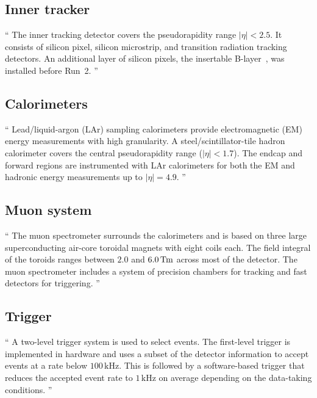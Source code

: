 \subsection{Inner tracker}
\label{sec:atlas_tracker}
\begin{displayquote}
``%
The inner tracking detector covers the pseudorapidity range $|\eta| < 2.5$.
It consists of silicon pixel, silicon microstrip, and transition radiation
tracking detectors.
An additional layer of silicon pixels, the insertable
B-layer~\cite{ATLAS-TDR-19, PIX-2018-001}, was installed before Run~2.%
''~\cite{atlas2022searches}
\end{displayquote}


\subsection{Calorimeters}
\label{sec:atlas_calo}
\begin{displayquote}
``%
Lead/liquid-argon (LAr) sampling calorimeters provide electromagnetic (EM)
energy measurements with high granularity.
A steel/scintillator-tile hadron calorimeter covers the central pseudorapidity
range ($|\eta| < 1.7$).
The endcap and forward regions are instrumented with LAr calorimeters for both
the EM and hadronic energy measurements up to $|\eta| = 4.9$.%
''~\cite{atlas2022searches}
\end{displayquote}


\subsection{Muon system}
\label{sec:atlas_muon}
\begin{displayquote}
``%
The muon spectrometer surrounds the calorimeters and is based on three large
superconducting air-core toroidal magnets with eight coils each.
The field integral of the toroids ranges between $2.0$ and
$6.0\,\mathrm{T\kern-0.15ex m}$ across most of the detector.
The muon spectrometer includes a system of precision chambers for tracking and
fast detectors for triggering.%
''~\cite{atlas2022searches}
\end{displayquote}


\subsection{Trigger}
\label{sec:atlas_trigger}
\begin{displayquote}
``%
A two-level trigger system is used to select events.
The first-level trigger is implemented in hardware and uses a subset of the
detector information to accept events at a rate below $100\,\mathrm{kHz}$.
This is followed by a software-based trigger that reduces the accepted event
rate to $1\,\mathrm{kHz}$ on average depending on the data-taking conditions.%
''~\cite{atlas2022searches}
\end{displayquote}


